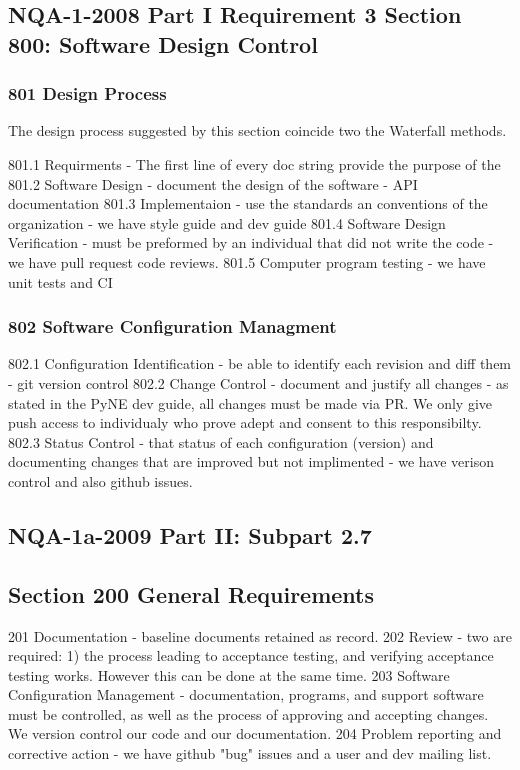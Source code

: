 \documentclass{anstrans}
\begin{document}
\subsection{NQA-1-2008 Part I Requirement 3 Section 800: Software Design Control}

\subsubsection{801 Design Process}

The design process suggested by this section coincide two the Waterfall methods.


801.1 Requirments - The first line of every doc string provide the purpose of the 
801.2 Software Design - document the design of the software - API documentation
801.3 Implementaion - use the standards an conventions of the organization - we have style guide and dev guide
801.4 Software Design Verification - must be preformed by an individual that did not write the code  - we have pull request code reviews.
801.5 Computer program testing - we have unit tests and CI

\subsubsection{802 Software Configuration Managment}

802.1 Configuration Identification - be able to identify each revision and diff them - git version control
802.2 Change Control - document and justify all changes - as stated in the PyNE dev guide, all changes must be made via PR. We only give push access to individualy who prove adept and consent to this responsibilty.
802.3 Status Control - that status of each configuration (version) and documenting changes that are improved but not implimented - we have verison control and also github issues.


\subsection{NQA-1a-2009 Part II: Subpart 2.7}

\subsection{Section 200 General Requirements}

201 Documentation - baseline documents retained as record.
202 Review  - two are required: 1) the process leading to acceptance testing, and verifying acceptance testing works. However this can be done at the same time.
203 Software Configuration Management - documentation, programs, and support software must be controlled, as well as the process of approving and accepting changes. We version control our code and our documentation.
204 Problem reporting and corrective action - we have github "bug" issues and a user and dev mailing list.
\end{document}
